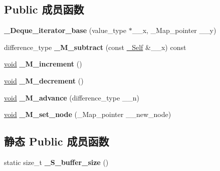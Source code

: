 \subsection*{Public 成员函数}
\begin{DoxyCompactItemize}
\item 
\mbox{\label{struct___deque__iterator__base_a576933f6b802a8f1904865b6b593a4a1}} 
{\bfseries \+\_\+\+Deque\+\_\+iterator\+\_\+base} (value\+\_\+type $\ast$\+\_\+\+\_\+x, \+\_\+\+Map\+\_\+pointer \+\_\+\+\_\+y)
\item 
\mbox{\label{struct___deque__iterator__base_a771a5dca17f9d31462bc7645f9babc8d}} 
difference\+\_\+type {\bfseries \+\_\+\+M\+\_\+subtract} (const \hyperlink{struct___deque__iterator__base}{\+\_\+\+Self} \&\+\_\+\+\_\+x) const
\item 
\mbox{\label{struct___deque__iterator__base_a65a66b4e97f02582f239815d5f09786e}} 
\hyperlink{interfacevoid}{void} {\bfseries \+\_\+\+M\+\_\+increment} ()
\item 
\mbox{\label{struct___deque__iterator__base_a9d4ff834722e51636b5fae64086cd63f}} 
\hyperlink{interfacevoid}{void} {\bfseries \+\_\+\+M\+\_\+decrement} ()
\item 
\mbox{\label{struct___deque__iterator__base_ac5e2feb25e7782907d506f05cffe74ac}} 
\hyperlink{interfacevoid}{void} {\bfseries \+\_\+\+M\+\_\+advance} (difference\+\_\+type \+\_\+\+\_\+n)
\item 
\mbox{\label{struct___deque__iterator__base_a19eb665f6316d4c94010dd9767401c17}} 
\hyperlink{interfacevoid}{void} {\bfseries \+\_\+\+M\+\_\+set\+\_\+node} (\+\_\+\+Map\+\_\+pointer \+\_\+\+\_\+new\+\_\+node)
\end{DoxyCompactItemize}
\subsection*{静态 Public 成员函数}
\begin{DoxyCompactItemize}
\item 
\mbox{\label{struct___deque__iterator__base_a2b9bc8c54d43d6c6cb57562a09f52e01}} 
static size\+\_\+t {\bfseries \+\_\+\+S\+\_\+buffer\+\_\+size} ()
\end{DoxyCompactItemize}

